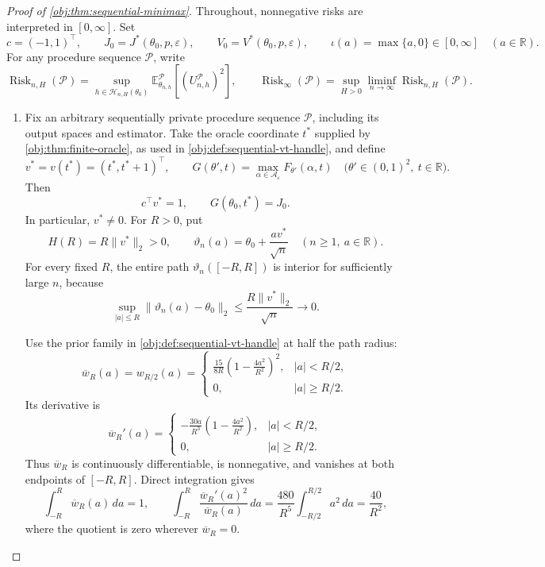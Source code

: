 \documentclass[11pt]{article}
\begin{document}
\begin{proof}[Proof of \cref{obj:thm:sequential-minimax}]
Throughout, nonnegative risks are interpreted in \([0,\infty]\). Set
\[
c=(-1,1)^\top,\qquad
J_0=J^*(\theta_0,p,\varepsilon),\qquad
V_0=V^*(\theta_0,p,\varepsilon),
\qquad
\iota(a)=\max\{a,0\}\in[0,\infty]\quad(a\in\mathbb R).
\]
For any procedure sequence \(\mathcal P\), write
\[
\operatorname{Risk}_{n,H}(\mathcal P)
=
\sup_{h\in\mathcal H_{n,H}(\theta_0)}
\mathbb E_{\theta_{n,h}}^{\mathcal P}
\!\left[(U_{n,h}^{\mathcal P})^2\right],
\qquad
\operatorname{Risk}_{\infty}(\mathcal P)
=
\sup_{H>0}\liminf_{n\to\infty}
\operatorname{Risk}_{n,H}(\mathcal P).
\]

\begin{enumerate}
\item
Fix an arbitrary sequentially private procedure sequence \(\mathcal P\), including its output spaces and estimator. Take the oracle coordinate \(t^*\) supplied by \cref{obj:thm:finite-oracle}, as used in \cref{obj:def:sequential-vt-handle}, and define
\[
v^*=v(t^*)=(t^*,t^*+1)^\top,
\qquad
G(\theta',t)
=
\max_{\alpha\in\mathcal A_\varepsilon}
F_{\theta'}(\alpha,t)
\quad
\bigl(\theta'\in(0,1)^2,\ t\in\mathbb R\bigr).
\]
Then
\[
c^\top v^*=1,
\qquad
G(\theta_0,t^*)=J_0.
\]
In particular, \(v^*\ne0\). For \(R>0\), put
\[
H(R)=R\|v^*\|_2>0,
\qquad
\vartheta_n(a)=\theta_0+\frac{a v^*}{\sqrt n}
\quad(n\ge1,\ a\in\mathbb R).
\]
For every fixed \(R\), the entire path \(\vartheta_n([-R,R])\) is interior for sufficiently large \(n\), because
\[
\sup_{|a|\le R}\|\vartheta_n(a)-\theta_0\|_2
\le \frac{R\|v^*\|_2}{\sqrt n}\longrightarrow0.
\]

Use the prior family in \cref{obj:def:sequential-vt-handle} at half the path radius:
\[
\overline w_R(a)=w_{R/2}(a)
=
\begin{cases}
\displaystyle
\frac{15}{8R}\left(1-\frac{4a^2}{R^2}\right)^2,
& |a|<R/2,\\[4pt]
0,& |a|\ge R/2.
\end{cases}
\]
Its derivative is
\[
\overline w_R'(a)
=
\begin{cases}
\displaystyle
-\frac{30a}{R^3}\left(1-\frac{4a^2}{R^2}\right),
& |a|<R/2,\\[4pt]
0,& |a|\ge R/2.
\end{cases}
\]
Thus \(\overline w_R\) is continuously differentiable, is nonnegative, and vanishes at both endpoints of \([-R,R]\). Direct integration gives
\[
\int_{-R}^{R}\overline w_R(a)\,da=1,
\qquad
\int_{-R}^{R}
\frac{\overline w_R'(a)^2}{\overline w_R(a)}\,da
=
\frac{480}{R^5}\int_{-R/2}^{R/2}a^2\,da
=
\frac{40}{R^2},
\]
where the quotient is zero wherever \(\overline w_R=0\).


\end{enumerate}
\end{proof}
\end{document}
